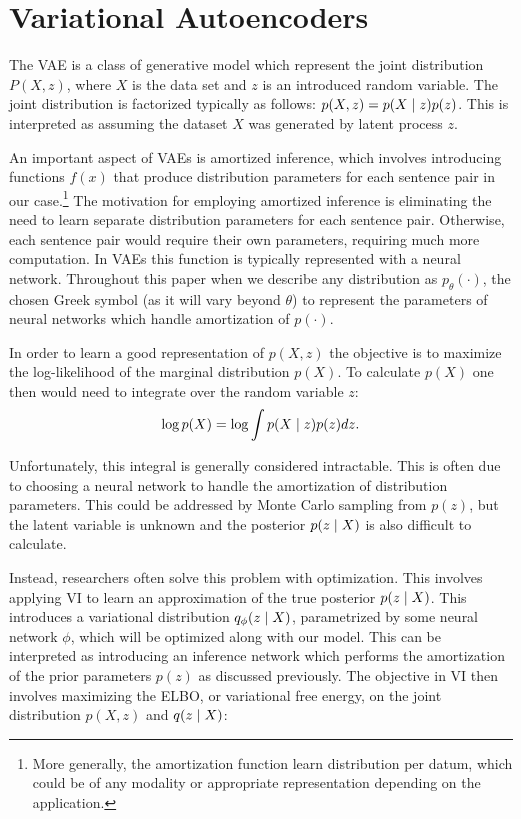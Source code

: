\section{Variational Autoencoders}

The \ac{VAE} is a class of generative model which represent the joint distribution $P(X, z)$, where $X$ is the data set and $z$ is an introduced random variable. The joint distribution is factorized typically as follows: $p(X, z) = p(X\; | \;{z})p(z)$. This is interpreted as assuming the dataset $X$ was generated by latent process  $z$. 

An important aspect of \ac{VAE}s is amortized inference, which involves introducing functions $f(x)$ that produce distribution parameters for each sentence pair in our case.\footnote{More generally, the amortization function learn distribution per datum, which could be of any modality or appropriate representation depending on the application.} The motivation for employing amortized inference is eliminating the need to learn separate distribution parameters for each sentence pair. Otherwise, each sentence pair would require their own parameters, requiring much more computation. In \ac{VAE}s this function is typically represented with a neural network. Throughout this paper when we describe any distribution as $p_{\theta}(\cdot)$, the chosen Greek symbol (as it will vary beyond $\theta$) to represent the parameters of neural networks which handle amortization of $p(\cdot)$. 

In order to learn a good representation of $p(X,z)$ the objective is to maximize the log-likelihood of the marginal distribution $p(X)$. To calculate $p(X)$ one then would need to integrate over the random variable $z$:
\begin{equation}
\log p(X) = \log \int p(X \; | \;{z}) p(z) dz.
\end{equation}

Unfortunately, this integral is generally considered intractable. This is often due to choosing a neural network to handle the amortization of distribution parameters. This could be addressed by Monte Carlo sampling from $p(z)$, but the latent variable is unknown and the posterior $p(z \; | \;{X})$ is also difficult to calculate. 

Instead, researchers often solve this problem with optimization. This involves applying \ac{VI} to learn an approximation of the true posterior $p(z \; | \;{X})$. This introduces a variational distribution $q_{\phi}(z \; | \;{X})$, parametrized by some neural network $\phi$, which will be optimized along with our model. This can be interpreted as introducing an inference network which performs the amortization of the prior parameters $p(z)$ as discussed previously. The objective in \ac{VI} then involves maximizing the \ac{ELBO}, or variational free energy, on the joint distribution $p(X, z)$ and $q(z \; | \;{X})$: 

